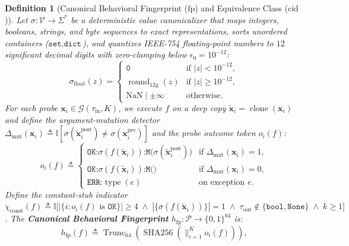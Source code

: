 \documentclass[10pt,twocolumn]{article}
\newtheorem{definition}{Definition}
\begin{document}
\begin{definition}[Canonical Behavioral Fingerprint ($\text{fp}$) and Equivalence Class ($\text{cid}$)]
Let $\sigma: \mathcal{V} \to \Sigma^*$ be a deterministic value canonicalizer that maps integers, booleans, strings, and byte sequences to exact representations, sorts unordered containers ($\texttt{set}, \texttt{dict}$), and quantizes IEEE-754 floating-point numbers to $12$ significant decimal digits with zero-clamping below $\epsilon_0 = 10^{-12}$:
\begin{equation}
    \sigma_{\text{float}}(z) = \begin{cases}
        \texttt{0} & \text{if } |z| < 10^{-12}, \\
        \operatorname{round}_{12\text{g}}(z) & \text{if } |z| \ge 10^{-12}, \\
        \text{NaN} \mid \pm\infty & \text{otherwise.}
    \end{cases}
\end{equation}
For each probe $\mathbf{x}_i \in \mathcal{G}(\tau_{\text{in}}, K)$, we execute $f$ on a deep copy $\tilde{\mathbf{x}}_i = \operatorname{clone}(\mathbf{x}_i)$ and define the argument-mutation detector $\Delta_{\text{mut}}(\mathbf{x}_i) \triangleq \mathbb{I}[\sigma(\tilde{\mathbf{x}}_i^{\text{post}}) \neq \sigma(\mathbf{x}_i^{\text{pre}})]$ and the probe outcome token $o_i(f)$:
\begin{equation}
    o_i(f) \triangleq \begin{cases}
        \texttt{OK:}\sigma(f(\tilde{\mathbf{x}}_i))\texttt{:M(}\sigma(\tilde{\mathbf{x}}_i^{\text{post}})\texttt{)} & \text{if } \Delta_{\text{mut}}(\mathbf{x}_i) = 1, \\
        \texttt{OK:}\sigma(f(\tilde{\mathbf{x}}_i))\texttt{:M()} & \text{if } \Delta_{\text{mut}}(\mathbf{x}_i) = 0, \\
        \texttt{ERR:}\operatorname{type}(e) & \text{on exception } e.
    \end{cases}
\end{equation}
Define the constant-stub indicator $\chi_{\text{const}}(f) \triangleq \mathbb{I}\big[|\{i : o_i(f) \text{ is }\texttt{OK}\}| \ge 4 \;\wedge\; |\{\sigma(f(\tilde{\mathbf{x}}_i))\}| = 1 \;\wedge\; \tau_{\text{out}} \notin \{\texttt{bool}, \texttt{None}\} \;\wedge\; k \ge 1\big]$. The \textbf{Canonical Behavioral Fingerprint} $h_{\text{fp}}: \mathcal{P} \to \{0,1\}^{64}$ is:
\begin{equation}
    h_{\text{fp}}(f) \triangleq \operatorname{Trunc}_{64}\!\left(\operatorname{SHA256}\!\left(\big\|_{i=1}^{K} o_i(f)\right)\right),
\end{equation}

\end{definition}
\end{document}
